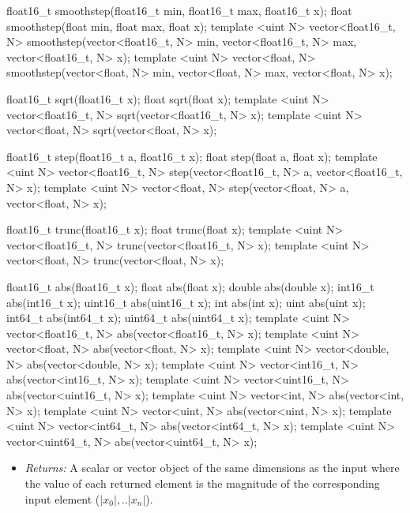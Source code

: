 \begin{HLSL}
float16_t smoothstep(float16_t min, float16_t max, float16_t x);
float smoothstep(float min, float max, float x);
template <uint N>
vector<float16_t, N> smoothstep(vector<float16_t, N> min,
                                vector<float16_t, N> max,
                                vector<float16_t, N> x);
template <uint N>
vector<float, N> smoothstep(vector<float, N> min, vector<float, N> max,
                            vector<float, N> x);

float16_t sqrt(float16_t x);
float sqrt(float x);
template <uint N> vector<float16_t, N> sqrt(vector<float16_t, N> x);
template <uint N> vector<float, N> sqrt(vector<float, N> x);

float16_t step(float16_t a, float16_t x);
float step(float a, float x);
template <uint N>
vector<float16_t, N> step(vector<float16_t, N> a, vector<float16_t, N> x);
template <uint N> vector<float, N> step(vector<float, N> a, vector<float, N> x);

float16_t trunc(float16_t x);
float trunc(float x);
template <uint N> vector<float16_t, N> trunc(vector<float16_t, N> x);
template <uint N> vector<float, N> trunc(vector<float, N> x);
\end{HLSL}


\begin{HLSL}
float16_t abs(float16_t x);
float abs(float x);
double abs(double x);
int16_t abs(int16_t x);
uint16_t abs(uint16_t x);
int abs(int x);
uint abs(uint x);
int64_t abs(int64_t x);
uint64_t abs(uint64_t x);
template <uint N> vector<float16_t, N> abs(vector<float16_t, N> x);
template <uint N> vector<float, N> abs(vector<float, N> x);
template <uint N> vector<double, N> abs(vector<double, N> x);
template <uint N> vector<int16_t, N> abs(vector<int16_t, N> x);
template <uint N> vector<uint16_t, N> abs(vector<uint16_t, N> x);
template <uint N> vector<int, N> abs(vector<int, N> x);
template <uint N> vector<uint, N> abs(vector<uint, N> x);
template <uint N> vector<int64_t, N> abs(vector<int64_t, N> x);
template <uint N> vector<uint64_t, N> abs(vector<uint64_t, N> x);
\end{HLSL}

\begin{itemize}
  \item \textit{Returns:} A scalar or vector object of the same dimensions as the
  input where the value of each returned element is the magnitude of the
  corresponding input element (\(|x_0|, .. |x_n|\)).
\end{itemize}


